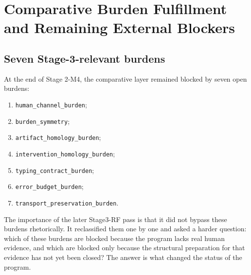 \documentclass[11pt,a4paper]{article}
\theoremstyle{definition}
\begin{document}
\section{Comparative Burden Fulfillment and Remaining External Blockers}
\subsection{Seven Stage-3-relevant burdens}
At the end of Stage 2-M4, the comparative layer remained blocked by seven open burdens:
\begin{enumerate}[leftmargin=1.5em]
\item \texttt{human\_channel\_burden};
\item \texttt{burden\_symmetry};
\item \texttt{artifact\_homology\_burden};
\item \texttt{intervention\_homology\_burden};
\item \texttt{typing\_contract\_burden};
\item \texttt{error\_budget\_burden};
\item \texttt{transport\_preservation\_burden}.
\end{enumerate}
The importance of the later Stage3-RF pass is that it did not bypass these burdens rhetorically. It reclassified them one by one and asked a harder question: which of these burdens are blocked because the program lacks real human evidence, and which are blocked only because the structural preparation for that evidence has not yet been closed? The answer is what changed the status of the program.
\end{document}
